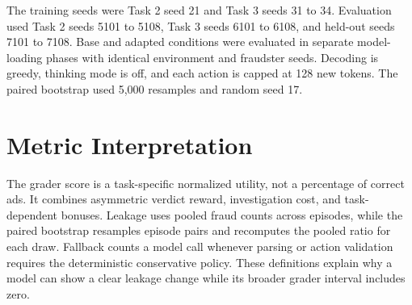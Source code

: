 \documentclass{article}
\begin{document}
The training seeds were Task 2 seed 21 and Task 3 seeds 31 to 34. Evaluation used Task 2 seeds 5101 to 5108, Task 3 seeds 6101 to 6108, and held-out seeds 7101 to 7108. Base and adapted conditions were evaluated in separate model-loading phases with identical environment and fraudster seeds. Decoding is greedy, thinking mode is off, and each action is capped at 128 new tokens. The paired bootstrap used 5,000 resamples and random seed 17.

\section{Metric Interpretation}

The grader score is a task-specific normalized utility, not a percentage of correct ads. It combines asymmetric verdict reward, investigation cost, and task-dependent bonuses. Leakage uses pooled fraud counts across episodes, while the paired bootstrap resamples episode pairs and recomputes the pooled ratio for each draw. Fallback counts a model call whenever parsing or action validation requires the deterministic conservative policy. These definitions explain why a model can show a clear leakage change while its broader grader interval includes zero.
\end{document}
